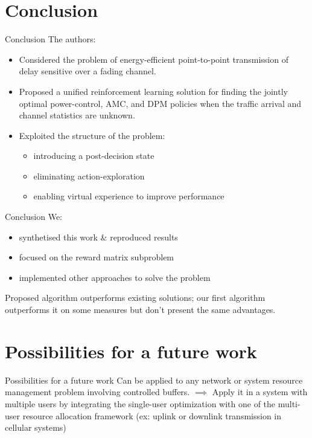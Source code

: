 \documentclass{beamer}
\begin{document}
\section{Conclusion}
\begin{frame}{Conclusion}
The authors:
\begin{itemize}
\item Considered the problem of energy-efficient point-to-point transmission of delay sensitive over a fading channel. 
\item Proposed a unified reinforcement learning solution for finding the jointly optimal power-control, AMC, and DPM policies when the traffic arrival and channel statistics are unknown. 
\item Exploited the structure of the problem:
\begin{itemize}
\item introducing a post-decision state
\item eliminating action-exploration
\item enabling virtual experience to improve performance
\end{itemize}
\end{itemize}
\end{frame}

\begin{frame}{Conclusion}
We:
\begin{itemize}
\item synthetised this work \& reproduced results
\item focused on the reward matrix subproblem
\item implemented other approaches to solve the problem
\end{itemize}
Proposed algorithm outperforms existing solutions;
our first algorithm outperforms it on some measures but don't present the same advantages.
\end{frame}

\section{Possibilities for a future work}
\begin{frame}{Possibilities for a future work}
Can be applied to any network or system resource management problem involving controlled buffers.
$\implies$ Apply it in a system with multiple users by integrating the single-user optimization with one of the multi-user resource allocation framework (ex: uplink or downlink transmission in cellular systems)
\end{frame}
\end{document}
